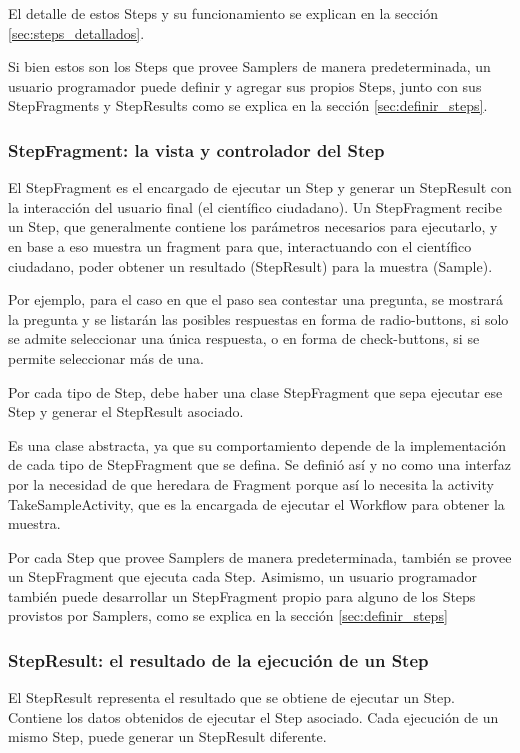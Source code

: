 El detalle de estos Steps y su funcionamiento se explican en la sección \ref{sec:steps_detallados}.

Si bien estos son los Steps que provee Samplers de manera predeterminada, un usuario programador puede definir y agregar sus propios Steps, junto con sus StepFragments y StepResults como se explica en la sección \ref{sec:definir_steps}.

\subsubsection{StepFragment: la vista y controlador del Step}
El StepFragment es el encargado de ejecutar un Step y generar un StepResult con la interacción del usuario final (el científico ciudadano). Un StepFragment recibe un Step, que generalmente contiene los parámetros necesarios para ejecutarlo, y en base a eso muestra un fragment para que, interactuando con el científico ciudadano, poder obtener un resultado (StepResult) para la muestra (Sample). 

Por ejemplo, para el caso en que el paso sea contestar una pregunta, se mostrará la pregunta y se listarán las posibles respuestas en forma de radio-buttons, si solo se admite seleccionar una única respuesta, o en forma de check-buttons, si se permite seleccionar más de una.

Por cada tipo de Step, debe haber una clase StepFragment que sepa ejecutar ese Step y generar el StepResult asociado.

Es una clase abstracta, ya que su comportamiento depende de la implementación de cada tipo de StepFragment que se defina. Se definió así y no como una interfaz por la necesidad de que heredara de Fragment porque así lo necesita la activity TakeSampleActivity, que es la encargada de ejecutar el Workflow para obtener la muestra.

Por cada Step que provee Samplers de manera predeterminada, también se provee un StepFragment que ejecuta cada Step. Asimismo, un usuario programador también puede desarrollar un StepFragment propio para alguno de los Steps provistos por Samplers, como se explica en la sección \ref{sec:definir_steps}



\subsubsection{StepResult: el resultado de la ejecución de un Step}
El StepResult representa el resultado que se obtiene de ejecutar un Step. Contiene los datos obtenidos de ejecutar el Step asociado. Cada ejecución de un mismo Step, puede generar un StepResult diferente.

